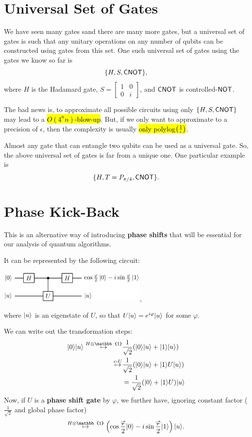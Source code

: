 \documentclass[12pt]{article}
\begin{document}
\section{Universal Set of Gates}
We have seen many gates sand there are many more gates, but a universal set of gates is such that any unitary operations on any number of qubits can be constructed using gates from this set. One such universal set of gates using the gates we know so far is $$
\{H, S, \CNOT\},
$$ where $H$ is the Hadamard gate, $S = \begin{bmatrix}
    1 & 0\\
    0 & i
\end{bmatrix}$, and $\CNOT$ is controlled-$\NOT$.

\begin{proposition}
The bad news is, to approximate all possible circuits using only $\{H, S, \CNOT\}$ may lead to a \hl{$O(4^nn)$-blow-up}. But, if we only want to approximate to a precision of $\epsilon$, then the complexity is usually \hl{only polylog$\prt{\frac{1}{\epsilon}}$}.
\end{proposition}

\begin{remark}
Almost any gate that can entangle two qubits can be used as a universal gate. So, the above universal set of gates is far from a unique one. One particular example is $$
\{H, T = P_{\pi/4}, \CNOT\}.
$$
\end{remark}

\section{Phase Kick-Back}
This is an alternative way of introducing \textbf{phase shifts} that will be essential for our analysis of quantum algorithms.
\begin{definition}
It can be represented by the following circuit:
\begin{center}
    \includegraphics[width = 20em]{images/10.jpg},
\end{center}
where $\Ket{u}$ is an eigenstate of $U$, so that $U\Ket{u} = e^{i\varphi}\Ket{u}$ for some $\varphi$.
\end{definition}

\noindent We can write out the transformation steps:$$
\begin{aligned}
\Ket{0}\Ket{u}
\overset{H\otimes \mathbb{1}}{\mapsto}
& \frac{1}{\sqrt{2}}(\Ket{0}\Ket{u} + \Ket{1}\Ket{u})\\
\overset{\text{c-}U}{\mapsto}
& \frac{1}{\sqrt{2}}(\Ket{0}\Ket{u} + \Ket{1}U\Ket{u})\\
& = \frac{1}{\sqrt{2}}(\Ket{0} + \Ket{1}U)\Ket{u}\\
\end{aligned}
$$ Now, if $U$ is a \textbf{phase shift gate} by $\varphi$, we further have, ignoring constant factor ($\frac{1}{\sqrt{2}}$ and global phase factor) $$
\overset{H\otimes\mathbb{1}}{\mapsto}\prt{\cos\frac{\varphi}{2}\Ket{0} - i\sin\frac{\varphi}{2}\Ket{1}}\Ket{u}.
$$
\end{document}
